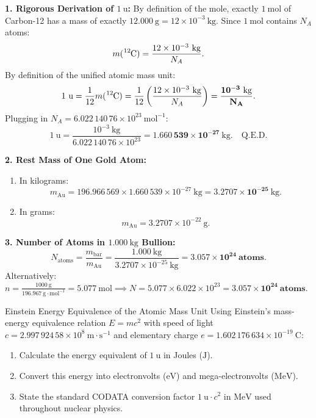 \begin{solution}
\textbf{1. Rigorous Derivation of $1\ \mathrm{u}$:}
By definition of the mole, exactly $1\ \mathrm{mol}$ of Carbon-12 has a mass of exactly $12.000\ \mathrm{g} = 12 \times 10^{-3}\ \mathrm{kg}$.
Since $1\ \mathrm{mol}$ contains $N_A$ atoms:
\[
m(\ce{^{12}C}) = \frac{12 \times 10^{-3}\ \mathrm{kg}}{N_A}.
\]
By definition of the unified atomic mass unit:
\[
1\ \mathrm{u} = \frac{1}{12} m(\ce{^{12}C}) = \frac{1}{12} \left( \frac{12 \times 10^{-3}\ \mathrm{kg}}{N_A} \right) = \mathbf{\frac{10^{-3}\ \mathrm{kg}}{N_A}}.
\]
Plugging in $N_A = 6.022\,140\,76 \times 10^{23}\ \mathrm{mol^{-1}}$:
\[
1\ \mathrm{u} = \frac{10^{-3}\ \mathrm{kg}}{6.022\,140\,76 \times 10^{23}} = \mathbf{1.660\,539 \times 10^{-27}\ \mathrm{kg}}. \quad \text{Q.E.D.}
\]

\textbf{2. Rest Mass of One Gold Atom:}
\begin{enumerate}[leftmargin=1.4em,itemsep=1pt]
  \item In kilograms:
  \[
  m_{\text{Au}} = 196.966\,569 \times 1.660\,539 \times 10^{-27}\ \mathrm{kg} = \mathbf{3.2707 \times 10^{-25}\ \mathrm{kg}}.
  \]
  \item In grams:
  \[
  m_{\text{Au}} = 3.2707 \times 10^{-22}\ \mathrm{g}.
  \]
\end{enumerate}

\textbf{3. Number of Atoms in $1.000\ \mathrm{kg}$ Bullion:}
\[
N_{\text{atoms}} = \frac{m_{\text{bar}}}{m_{\text{Au}}} = \frac{1.000\ \mathrm{kg}}{3.2707 \times 10^{-25}\ \mathrm{kg}} = \mathbf{3.057 \times 10^{24}\ \text{atoms}}.
\]
Alternatively: $n = \frac{1000\ \mathrm{g}}{196.967\ \mathrm{g\cdot mol^{-1}}} = 5.077\ \mathrm{mol} \implies N = 5.077 \times 6.022 \times 10^{23} = \mathbf{3.057 \times 10^{24}\ \text{atoms}}$.
\end{solution}

\begin{exercise}{Einstein Energy Equivalence of the Atomic Mass Unit}
Using Einstein's mass-energy equivalence relation $E = m c^2$ with speed of light $c = 2.997\,924\,58 \times 10^8\ \mathrm{m\cdot s^{-1}}$ and elementary charge $e = 1.602\,176\,634 \times 10^{-19}\ \mathrm{C}$:
\begin{enumerate}[leftmargin=1.5em,itemsep=2pt]
  \item Calculate the energy equivalent of $1\ \mathrm{u}$ in Joules ($\mathrm{J}$).
  \item Convert this energy into electronvolts ($\mathrm{eV}$) and mega-electronvolts ($\mathrm{MeV}$).
  \item State the standard CODATA conversion factor $1\ \mathrm{u} \cdot c^2$ in $\mathrm{MeV}$ used throughout nuclear physics.
\end{enumerate}
\end{exercise}

